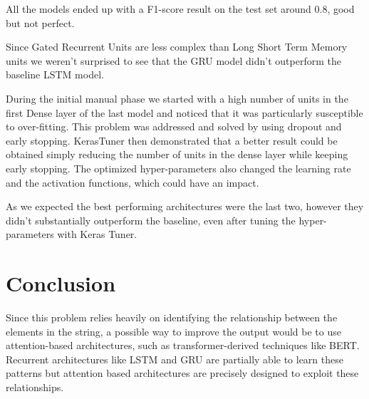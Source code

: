 \documentclass[11pt]{article}
\begin{document}

All the models ended up with a F1-score result on the test set around 0.8, good but not perfect.

Since Gated Recurrent Units are less complex than Long Short Term Memory units we weren't surprised to see that the GRU model didn't outperform the baseline LSTM model.

During the initial manual phase we started with a high number of units in the first Dense layer of the last model and noticed that it was particularly susceptible to over-fitting. This problem was addressed and solved by using dropout and early stopping. KerasTuner then demonstrated that a better result could be obtained simply reducing the number of units in the dense layer while keeping early stopping. The optimized hyper-parameters also changed the learning rate and the activation functions, which could have an impact.

As we expected the best performing architectures were the last two, however they didn't substantially outperform the baseline, even after tuning the hyper-parameters with Keras Tuner.

\section{Conclusion}
\label{sec:conclusion}


Since this problem relies heavily on identifying the relationship between the elements in the string, a possible way to improve the output would be to use attention-based architectures, such as transformer-derived techniques like BERT. Recurrent architectures like LSTM and GRU are partially able to learn these patterns but attention based architectures are precisely designed to exploit these relationships.
\end{document}
